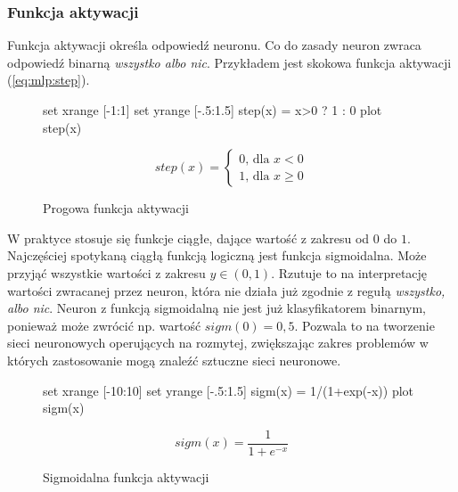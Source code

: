 \documentclass[a4paper,12pt,twoside,openany]{report}
\newcommand{\Eq}[1]{(\ref{#1})}
\begin{document}
\subsubsection{Funkcja aktywacji}
Funkcja aktywacji określa odpowiedź neuronu.
Co do zasady neuron zwraca odpowiedź binarną \textit{wszystko albo nic}.
Przykładem jest skokowa funkcja aktywacji \Eq{eq:mlp:step}.
\begin{figure}[h]
	\label{wyk:mlp:step}
	\centering
	\begin{gnuplot}[terminal=pdf,terminaloptions=color]
		set xrange [-1:1] 
		set yrange [-.5:1.5]
		step(x) = x>0 ? 1 : 0
		plot step(x)
	\end{gnuplot}
	\begin{equation}
		step(x)={\begin{cases}0{\text{, dla }}x<0\\1{\text{, dla }}x\geq 0\end{cases}}
	\end{equation}
	\caption{Progowa funkcja aktywacji}
\end{figure}

W praktyce stosuje się funkcje ciągłe, dające wartość z zakresu od $0$ do $1$.
Najczęściej spotykaną ciągłą funkcją logiczną jest funkcja sigmoidalna.
Może przyjąć wszystkie wartości z zakresu $y \in (0,1)$.
Rzutuje to na interpretację wartości zwracanej przez neuron,
która nie działa już zgodnie z regułą \textit{wszystko, albo nic}.
Neuron z funkcją sigmoidalną nie jest już klasyfikatorem binarnym, ponieważ może zwrócić np. wartość $sigm(0) = 0,5$.
Pozwala to na tworzenie sieci neuronowych operujących na rozmytej,
zwiększając zakres problemów w których zastosowanie mogą znaleźć sztuczne sieci neuronowe.


\begin{figure}[h]
	\label{wyk:mlp:sigm}
	\centering
	\begin{gnuplot}[terminal=pdf,terminaloptions=color]
		set xrange [-10:10] 
		set yrange [-.5:1.5]
		sigm(x) = 1/(1+exp(-x))
		plot sigm(x)
	\end{gnuplot}
	\begin{equation}
		sigm(x)=\frac{1}{1+e^{-x}}
	\end{equation}
	\caption{Sigmoidalna funkcja aktywacji}
\end{figure}
\end{document}
